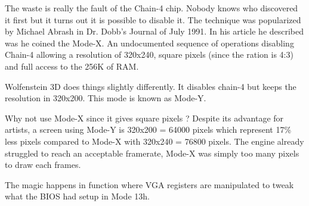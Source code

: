\documentclass[book.tex]{subfiles}
\begin{document}
 \par
 The waste is really the fault of the Chain-4 chip. Nobody knows who discovered it first but it turns out it is possible to disable it. The technique was popularized by Michael Abrash in Dr. Dobb's Journal of July 1991. In his article he described was he coined the Mode-X. An undocumented sequence of operations disabling Chain-4 allowing a resolution of 320x240, square pixels (since the ration is 4:3) and full access to the 256K of RAM.\\
 \par
 Wolfenstein 3D does things slightly differently. It disables chain-4 but keeps the resolution in 320x200. This mode is known as Mode-Y. \\
 \par
  Why not use Mode-X since it gives square pixels ? Despite its advantage for artists, a screen using Mode-Y is 320x200 = 64000 pixels which represent 17\% less pixels compared to Mode-X with 320x240 = 76800 pixels. The engine already struggled to reach an acceptable framerate, Mode-X was simply too many pixels to draw each frames.\\
 \par
{}
 \par
  \begin{minipage}{\textwidth}

\end{minipage}
 \par

The magic happens in function  where VGA registers are manipulated to tweak what the BIOS had setup in Mode 13h. \\
\end{document}
